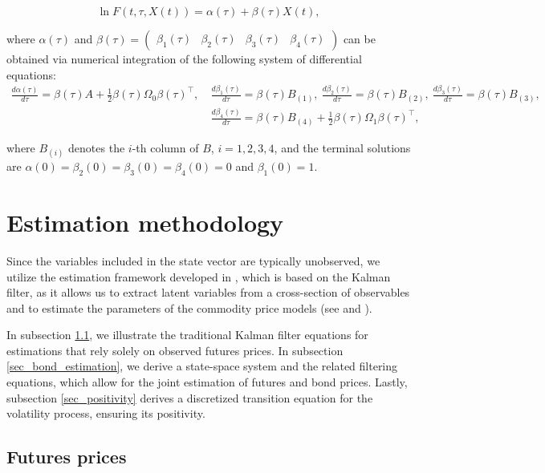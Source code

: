 \documentclass{article}
\begin{document}
\begin{equation*}
    \ln{F(t,\tau, X(t))} = \alpha(\tau) + \beta(\tau) {X}(t),
\end{equation*}

\noindent where $\alpha(\tau)$ and  $\beta(\tau) = \begin{pmatrix}
    \beta_1(\tau) & \beta_2(\tau) & \beta_3(\tau) & \beta_4(\tau)
\end{pmatrix}$ can be obtained via numerical integration of the following system of differential equations:
\begin{align*}
    \frac{d\alpha(\tau)}{d\tau} = \beta(\tau) A + \frac{1}{2}  \beta(\tau) \Omega_0 \beta(\tau)^\top,  \
    &\frac{d\beta_1(\tau)}{d\tau} = \beta(\tau) B_{(1)}, \
    \frac{d\beta_2(\tau)}{d\tau} = \beta(\tau) B_{(2)},\
    \frac{d\beta_3(\tau)}{d\tau} = \beta(\tau) B_{(3)}, 
    \\ 
     &\frac{d\beta_4(\tau)}{d\tau} = \beta(\tau) B_{(4)} + \frac{1}{2} \beta(\tau) \Omega_1 \beta(\tau)^\top,
\end{align*}

\noindent where $B_{(i)}$ denotes the $i$-th column of $B$, $i=1,2,3,4$, and the terminal solutions are $\alpha(0)= \beta_2(0)=\beta_3(0)=\beta_4(0)=0$ and $\beta_1(0)=1$.

\section{Estimation methodology} \label{sec_method}

Since the variables included in the state vector are typically unobserved, we utilize the estimation framework developed in \cite{duan99}, which is based on the Kalman filter, as it allows us to extract latent variables from a cross-section of observables and to estimate the parameters of the commodity price models (see \cite{schwartz97} and \cite{spinler17}). 

In subsection \ref{sec_futures_estimation}, we illustrate the traditional Kalman filter equations for estimations that rely solely on observed futures prices. In subsection \ref{sec_bond_estimation}, we derive a state-space system and the related filtering equations, which allow for the joint estimation of futures and bond prices. Lastly, subsection \ref{sec_positivity} derives a discretized transition equation for the volatility process, ensuring its positivity.

\subsection{Futures prices} \label{sec_futures_estimation}
\end{document}
